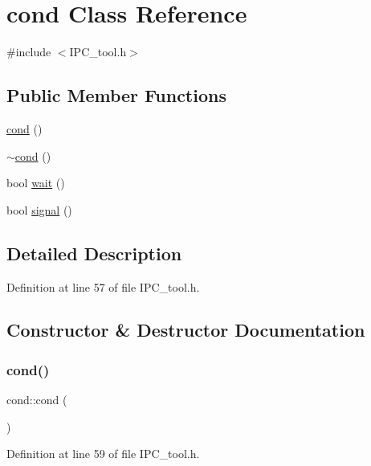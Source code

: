 \hypertarget{classcond}{}\section{cond Class Reference}
\label{classcond}


{\ttfamily \#include $<$I\+P\+C\+\_\+tool.\+h$>$}

\subsection*{Public Member Functions}
\begin{DoxyCompactItemize}
\item 
\hyperlink{classcond_ae2a80e12e8ebf1d0a61b7c59e6c01d0d}{cond} ()
\item 
\hyperlink{classcond_ab33755bcd72bcd35d42853c4b9c05902}{$\sim$cond} ()
\item 
bool \hyperlink{classcond_ae495616f19927b2a063e5be336cbe610}{wait} ()
\item 
bool \hyperlink{classcond_a29d17ca3d304fbce1d4abe3a335b7a6a}{signal} ()
\end{DoxyCompactItemize}


\subsection{Detailed Description}


Definition at line 57 of file I\+P\+C\+\_\+tool.\+h.



\subsection{Constructor \& Destructor Documentation}
\mbox{\label{classcond_ae2a80e12e8ebf1d0a61b7c59e6c01d0d}} 
\subsubsection{\texorpdfstring{cond()}{cond()}}
{\footnotesize\ttfamily cond\+::cond (\begin{DoxyParamCaption}{ }\end{DoxyParamCaption})\hspace{0.3cm}{\ttfamily [inline]}}



Definition at line 59 of file I\+P\+C\+\_\+tool.\+h.

